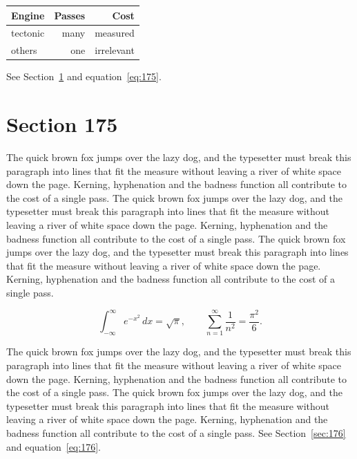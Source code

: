 \documentclass{article}
\begin{document}
\begin{center}
\begin{tabular}{lrr}
\toprule
Engine & Passes & Cost \\
\midrule
tectonic & many & measured \\
others & one & irrelevant \\
\bottomrule
\end{tabular}
\end{center}

See Section~\ref{sec:175} and equation~\eqref{eq:175}.
\section{Section 175}
\label{sec:175}
The quick brown fox jumps over the lazy dog, and the typesetter must break this paragraph into lines that fit the measure without leaving a river of white space down the page. Kerning, hyphenation and the badness function all contribute to the cost of a single pass. The quick brown fox jumps over the lazy dog, and the typesetter must break this paragraph into lines that fit the measure without leaving a river of white space down the page. Kerning, hyphenation and the badness function all contribute to the cost of a single pass. The quick brown fox jumps over the lazy dog, and the typesetter must break this paragraph into lines that fit the measure without leaving a river of white space down the page. Kerning, hyphenation and the badness function all contribute to the cost of a single pass. 

\begin{equation}\label{eq:175}
\int_{-\infty}^{\infty} e^{-x^{2}}\,dx = \sqrt{\pi}, \qquad
\sum_{n=1}^{\infty} \frac{1}{n^{2}} = \frac{\pi^{2}}{6}.
\end{equation}

The quick brown fox jumps over the lazy dog, and the typesetter must break this paragraph into lines that fit the measure without leaving a river of white space down the page. Kerning, hyphenation and the badness function all contribute to the cost of a single pass. The quick brown fox jumps over the lazy dog, and the typesetter must break this paragraph into lines that fit the measure without leaving a river of white space down the page. Kerning, hyphenation and the badness function all contribute to the cost of a single pass. 
See Section~\ref{sec:176} and equation~\eqref{eq:176}.
\end{document}
